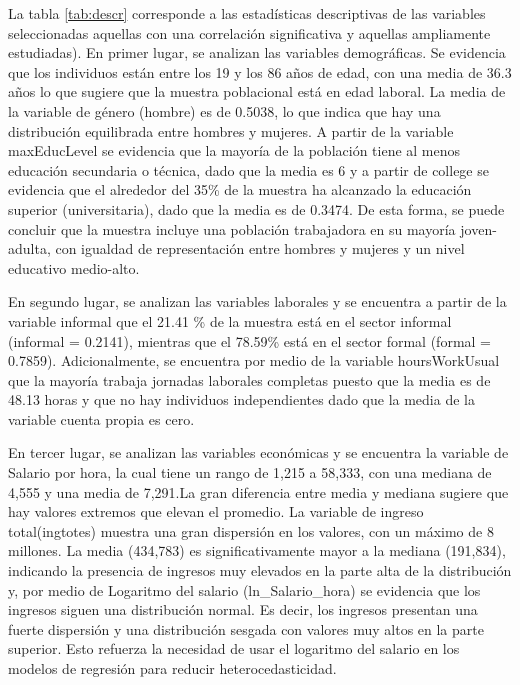 \documentclass[12pt,a4paper,onecolumn]{article}
\begin{document}
\begin{enumerate}
\begin{enumerate}
La tabla \ref{tab:descr} corresponde a las estad\'isticas descriptivas de las variables seleccionadas aquellas con una correlaci\'on significativa y aquellas ampliamente estudiadas). En primer lugar, se analizan las variables demogr\'aficas. Se evidencia que los individuos est\'an entre los 19 y los 86 a\~nos de edad, con una media de 36.3 a\~nos lo que sugiere que la muestra poblacional est\'a en edad laboral. La media de la variable de g\'enero (hombre) es de 0.5038, lo que indica que hay una distribuci\'on equilibrada entre hombres y mujeres. A partir de la variable  maxEducLevel se evidencia que la mayor\'ia de la poblaci\'on tiene al menos educaci\'on secundaria o t\'ecnica, dado que la media es 6 y a partir de college se evidencia que el alrededor del 35\% de la muestra ha alcanzado la educaci\'on superior (universitaria), dado que la media es de 0.3474. De esta forma, se puede concluir que la muestra incluye una poblaci\'on trabajadora en su mayor\'ia joven-adulta, con igualdad de representaci\'on entre hombres y mujeres y un nivel educativo medio-alto. 

En segundo lugar, se analizan las variables laborales y se encuentra a partir de la variable informal que el 21.41 \% de la muestra est\'a en el sector informal (informal = 0.2141), mientras que el 78.59\% est\'a en el sector formal (formal = 0.7859). Adicionalmente, se encuentra por medio de la variable hoursWorkUsual que la mayor\'ia trabaja jornadas laborales completas puesto que la media es de 48.13 horas y que no hay individuos independientes dado que la media de la variable cuenta propia es cero. 

En tercer lugar, se analizan las variables econ\'omicas y se encuentra la variable de Salario por hora, la cual tiene un rango de 1,215 a 58,333, con una mediana de 4,555 y una media de 7,291.La gran diferencia entre media y mediana sugiere que hay valores extremos que elevan el promedio. La variable de ingreso total(ingtotes) muestra una gran dispersi\'on en los valores, con un m\'aximo de 8 millones. La media (434,783) es significativamente mayor a la mediana (191,834), indicando la presencia de ingresos muy elevados en la parte alta de la distribuci\'on y, por medio de Logaritmo del salario (ln\_Salario\_hora) se evidencia que los ingresos siguen una distribuci\'on normal. Es decir, los ingresos presentan una fuerte dispersi\'on y una distribuci\'on sesgada con valores muy altos en la parte superior. Esto refuerza la necesidad de usar el logaritmo del salario en los modelos de regresi\'on para reducir heterocedasticidad. 


\end{enumerate}
\end{enumerate}
\end{document}
